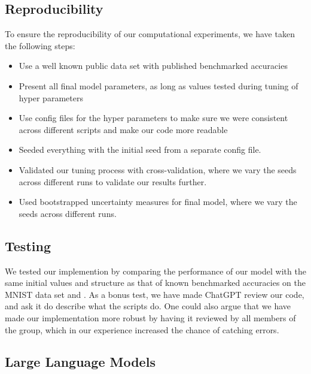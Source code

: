 \subsection{Reproducibility}
To ensure the reproducibility of our computational experiments, we have taken the following steps:
\begin{itemize}
    \item Use a well known public data set with published benchmarked accuracies
    \item Present all final model parameters, as long as values tested during tuning of hyper parameters
    \item Use config files for the hyper parameters to make sure we were consistent across different scripts and make our code more readable
    \item Seeded everything with the initial seed from a separate config file.
    \item Validated our tuning process with cross-validation, where we vary the seeds across different runs to validate our results further. 
    \item Used bootstrapped uncertainty measures for final model, where we vary the seeds across different runs. 
\end{itemize}

\subsection{Testing}
We tested our implemention by comparing the performance of our model with the same initial values and structure as that of known benchmarked accuracies on the MNIST data set \cite{raschka2022machine} and \cite{lecun2015deep}. As a bonus test, we have made ChatGPT review our code, and ask it do describe what the scripts do. One could also argue that we have made our implementation more robust by having it reviewed by all members of the group, which in our experience increased the chance of catching errors. 

\subsection{Large Language Models}

